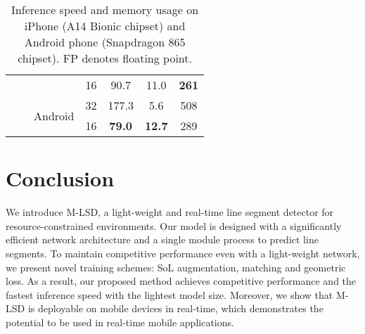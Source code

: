 \documentclass[letterpaper]{article} \usepackage{aaai22}  \usepackage{times}  \usepackage{helvet}  \usepackage{courier}  \usepackage[hyphens]{url}  \usepackage{graphicx} \urlstyle{rm} \def\UrlFont{\rm}  \usepackage{natbib}  \usepackage{caption} \DeclareCaptionStyle{ruled}{labelfont=normalfont,labelsep=colon,strut=off} \frenchspacing  \setlength{\pdfpagewidth}{8.5in}  \setlength{\pdfpageheight}{11in}  \usepackage{algorithm}
\begin{document}
\begin{table}[t!]
\begin{adjustbox}{width=1.0\columnwidth,center}
\begin{tabular}{lcccccc}
                            &                      &                          & 16 & 90.7         & 11.0 & \textbf{261}         \\ \cline{3-7} 
                            &                      & \multirow{2}{*}{Android} & 32 & 177.3        & 5.6  & 508         \\
                            &                      &                          & 16 & \textbf{79.0}         & \textbf{12.7} & 289         \\
\bottomrule
\end{tabular}
\end{adjustbox}
\caption{Inference speed and memory usage on iPhone (A14 Bionic chipset) and Android phone (Snapdragon 865 chipset). FP denotes floating point.}
\label{table:mobile}
\end{table}

\section{Conclusion}
We introduce M-LSD, a light-weight and real-time line segment detector for resource-constrained environments.
Our model is designed with a significantly efficient network architecture and a single module process to predict line segments.
To maintain competitive performance even with a light-weight network, we present novel training schemes: SoL augmentation, matching and geometric loss.
As a result, our proposed method achieves competitive performance and the fastest inference speed with the lightest model size.
Moreover, we show that M-LSD is deployable on mobile devices in real-time, which demonstrates the potential to be used in real-time mobile applications.
     


\clearpage


\end{document}
